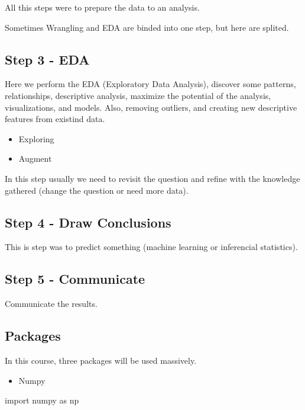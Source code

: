 \documentclass[]{book}
\newenvironment{Shaded}{\begin{snugshade}}{\end{snugshade}}
\newcommand{\ImportTok}[1]{#1}
\newcommand{\NormalTok}[1]{#1}
\providecommand{\tightlist}{%
  \setlength{\itemsep}{0pt}\setlength{\parskip}{0pt}}
\begin{document}
All this steps were to prepare the data to an analysis.

Sometimes Wrangling and EDA are binded into one step, but here are
splited.

\subsection{Step 3 - EDA}\label{step-3---eda}

Here we perform the EDA (Exploratory Data Analysis), discover some
patterns, relationships, descriptive analysis, maximize the potential of
the analysis, visualizations, and models. Also, removing outliers, and
creating new descriptive features from existind data.

\begin{itemize}
\tightlist
\item
  Exploring
\item
  Augment
\end{itemize}

In this step usually we need to revisit the question and refine with the
knowledge gathered (change the question or need more data).

\subsection{Step 4 - Draw Conclusions}\label{step-4---draw-conclusions}

This is step was to predict something (machine learning or inferencial
statistics).

\subsection{Step 5 - Communicate}\label{step-5---communicate}

Communicate the results.

\subsection{Packages}\label{packages}

In this course, three packages will be used massively.

\begin{itemize}
\tightlist
\item
  Numpy
\end{itemize}

\begin{Shaded}
\begin{Highlighting}[]
\ImportTok{import}\NormalTok{ numpy }\ImportTok{as}\NormalTok{ np}
\end{Highlighting}
\end{Shaded}
\end{document}
